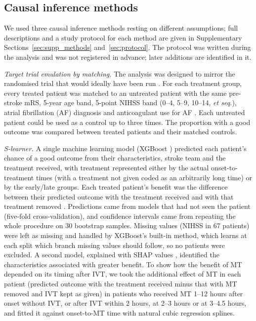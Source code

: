 \subsection{Causal inference methods}

We used three causal inference methods resting on different assumptions; full descriptions and a study protocol for each method are given in Supplementary Sections~\ref{sec:supp_methods} and~\ref{sec:protocol}. The protocol was written during the analysis and was not registered in advance; later additions are identified in it.

\textit{Target trial emulation by matching.} The analysis was designed to mirror the randomised trial that would ideally have been run \cite{hernan2016}. For each treatment group, every treated patient was matched to an untreated patient with the same pre-stroke mRS, 5-year age band, 5-point NIHSS band (0--4, 5--9, 10--14, \textit{et seq.}), atrial fibrillation (AF) diagnosis and anticoagulant use for AF \cite{stuart2010matching}. Each untreated patient could be used as a control up to three times. The proportion with a good outcome was compared between treated patients and their matched controls.

\textit{S-learner.} A single machine learning model (XGBoost \cite{chen_xgboost_2016}) predicted each patient's chance of a good outcome from their characteristics, stroke team and the treatment received, with treatment represented either by the actual onset-to-treatment times (with a treatment not given coded as an arbitrarily long time) or by the early/late groups. Each treated patient's benefit was the difference between their predicted outcome with the treatment received and with that treatment removed \cite{kunzel2019metalearners}. Predictions came from models that had not seen the patient (five-fold cross-validation), and confidence intervals came from repeating the whole procedure on 30 bootstrap samples. Missing values (NIHSS in 67 patients) were left as missing and handled by XGBoost's built-in method, which learns at each split which branch missing values should follow, so no patients were excluded. A second model, explained with SHAP values \cite{shap_documentation}, identified the characteristics associated with greater benefit. To show how the benefit of MT depended on its timing after IVT, we took the additional effect of MT in each patient (predicted outcome with the treatment received minus that with MT removed and IVT kept as given) in patients who received MT 1--12 hours after onset without IVT, or after IVT within 2 hours, at 2--3 hours or at 3--4.5 hours, and fitted it against onset-to-MT time with natural cubic regression splines.

